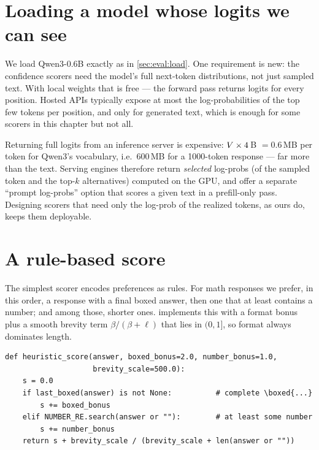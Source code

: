\section{Loading a model whose logits we can see}\label{sec:refine:load}


We load Qwen3-0.6B exactly as in \cref{sec:eval:load}. One requirement is new: the confidence scorers
need the model's full next-token distributions, not just sampled text. With local weights that is
free --- the forward pass returns logits for every position. Hosted APIs typically expose at most the
log-probabilities of the top few tokens per position, and only for generated text, which is enough
for some scorers in this chapter but not all.

\begin{systemslens}
Returning full logits from an inference server is expensive: $V \times 4$\,B $= 0.6$\,MB per
token for Qwen3's vocabulary, i.e.\ 600\,MB for a 1000-token response --- far more than the text.
Serving engines therefore return \emph{selected} log-probs (of the sampled token and the top-$k$
alternatives) computed on the GPU, and offer a separate ``prompt log-probs'' option that scores a
given text in a prefill-only pass. Designing scorers that need only the log-prob of the realized
tokens, as ours do, keeps them deployable.
\end{systemslens}

\section{A rule-based score}\label{sec:refine:rule}


The simplest scorer encodes preferences as rules. For math responses we prefer, in this order, a
response with a final boxed answer, then one that at least contains a number; and among those, shorter
ones.  implements this with a format bonus plus a smooth brevity term
$\beta/(\beta + \ell)$ that lies in $(0, 1]$, so format always dominates length.

\begin{lstlisting}[caption={A rule-based scorer for format and brevity (\texttt{llmsys/tts.py}).},label={lst:refine:heuristic}]
def heuristic_score(answer, boxed_bonus=2.0, number_bonus=1.0,
                    brevity_scale=500.0):
    s = 0.0
    if last_boxed(answer) is not None:          # complete \boxed{...}
        s += boxed_bonus
    elif NUMBER_RE.search(answer or ""):        # at least some number
        s += number_bonus
    return s + brevity_scale / (brevity_scale + len(answer or ""))
\end{lstlisting}

